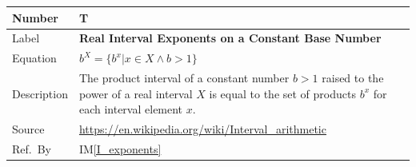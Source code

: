\documentclass[12pt]{article}
\newcommand{\colAwidth}{0.13\textwidth}
\newcommand{\colBwidth}{0.82\textwidth}
\newcounter{theorynum} %
\newcommand{\iref}[1]{IM\ref{#1}}
\begin{document}
\noindent
\begin{minipage}{\textwidth}
	\renewcommand*{\arraystretch}{1.5}
	\begin{tabular}{| p{\colAwidth} | p{\colBwidth}|}
		\hline
		\rowcolor[gray]{0.9}
		Number& T{theorynum}\thetheorynum 
		\label{T_exponents}\\
		\hline
		Label&\bf Real Interval Exponents on a Constant Base Number\\
		\hline
		Equation&  $b^X = \{b^x | x \in X \wedge b > 1\}$\\
		\hline
		Description & The product interval of a constant number $b > 1$ raised 
		to the power of a real interval $X$ is equal to the set of products 
		$b^x$ for each interval element $x$.\\
		\hline
		Source & \url{https://en.wikipedia.org/wiki/Interval_arithmetic}\\
		\hline
		Ref.\ By & \iref{I_exponents}\\
		\hline
	\end{tabular}
\end{minipage}\\

~\newline
\end{document}
